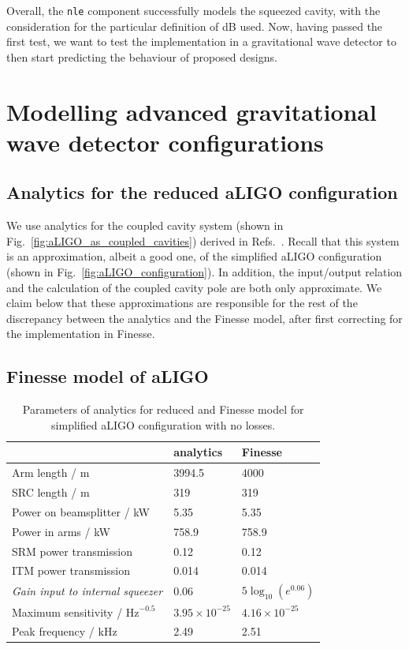 \documentclass[aps,pra,superscriptaddress,reprint,nofootinbib]{revtex4-1}
\newcommand{\code}[1]{\texttt{#1}}
\begin{document}
Overall, the \code{nle} component successfully models the squeezed cavity, with the consideration for the particular definition of dB used. Now, having passed the first test, we want to test the implementation in a gravitational wave detector to then start predicting the behaviour of proposed designs.


\section{Modelling advanced gravitational wave detector configurations}
\label{sec:aLIGOcomparison}

\subsection{Analytics for the reduced aLIGO configuration}

We use analytics for the coupled cavity system (shown in Fig.~\ref{fig:aLIGO_as_coupled_cavities}) derived in Refs.~\cite{Korobko_2019,SOMIYA2016521}. Recall that this system is an approximation, albeit a good one, of the simplified aLIGO configuration (shown in Fig.~\ref{fig:aLIGO_configuration}). In addition, the input/output relation and the calculation of the coupled cavity pole are both only approximate. We claim below that these approximations are responsible for the rest of the discrepancy between the analytics and the Finesse model, after first correcting for the implementation in Finesse.


\subsection{Finesse model of aLIGO}

\begin{table}
	\centering
	\begin{tabular}{l|ll}
	 & analytics & Finesse \\ \hline
	Arm length / m & 3994.5 & 4000 \\
	SRC length / m & 319 & 319 \\
	Power on beamsplitter / kW & 5.35 & 5.35 \\
	Power in arms / kW & 758.9 & 758.9 \\
	SRM power transmission & 0.12 & 0.12 \\
	ITM power transmission & 0.014 & 0.014 \\
	\textit{Gain input to internal squeezer} & 0.06 & $5 \log_{10}(e^{0.06})$ \\
	Maximum sensitivity / $\mathrm{Hz}^{-0.5}$ & $3.95 \times 10^{-25}$ & $4.16 \times 10^{-25}$ \\
	Peak frequency / kHz & 2.49 & 2.51
	\end{tabular}%
	\caption{Parameters of analytics for reduced and Finesse model for simplified aLIGO configuration with no losses.}
	\label{tab:aLIGO_parameters}
\end{table}
\end{document}
